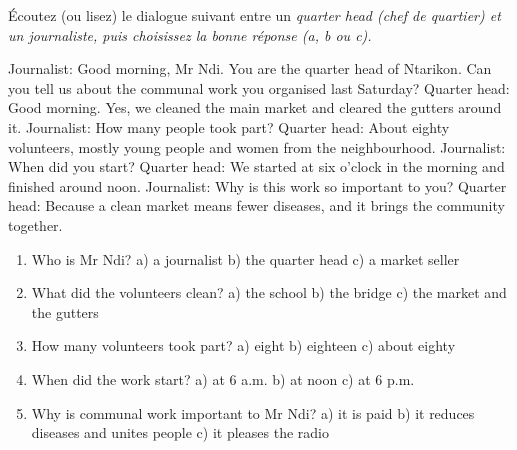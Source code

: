 \documentclass[11pt]{article}
\newcommand{\eng}[1]{\ifmmode\text{\textit{#1}}\else\begingroup\selectlanguage{english}\itshape #1\endgroup\fi}
\begin{document}
\begin{exercice}
Écoutez (ou lisez) le dialogue suivant entre un \eng{quarter head} (chef de quartier) et un journaliste, puis choisissez la bonne réponse (a, b ou c).
\begin{textebox}
Journalist: Good morning, Mr Ndi. You are the quarter head of Ntarikon. Can you tell us about the communal work you organised last Saturday?
Quarter head: Good morning. Yes, we cleaned the main market and cleared the gutters around it.
Journalist: How many people took part?
Quarter head: About eighty volunteers, mostly young people and women from the neighbourhood.
Journalist: When did you start?
Quarter head: We started at six o'clock in the morning and finished around noon.
Journalist: Why is this work so important to you?
Quarter head: Because a clean market means fewer diseases, and it brings the community together.
\end{textebox}
\begin{enumerate}
\item Who is Mr Ndi? \quad a) a journalist \quad b) the quarter head \quad c) a market seller
\item What did the volunteers clean? \quad a) the school \quad b) the bridge \quad c) the market and the gutters
\item How many volunteers took part? \quad a) eight \quad b) eighteen \quad c) about eighty
\item When did the work start? \quad a) at 6 a.m. \quad b) at noon \quad c) at 6 p.m.
\item Why is communal work important to Mr Ndi? \quad a) it is paid \quad b) it reduces diseases and unites people \quad c) it pleases the radio
\end{enumerate}
\end{exercice}
\end{document}
